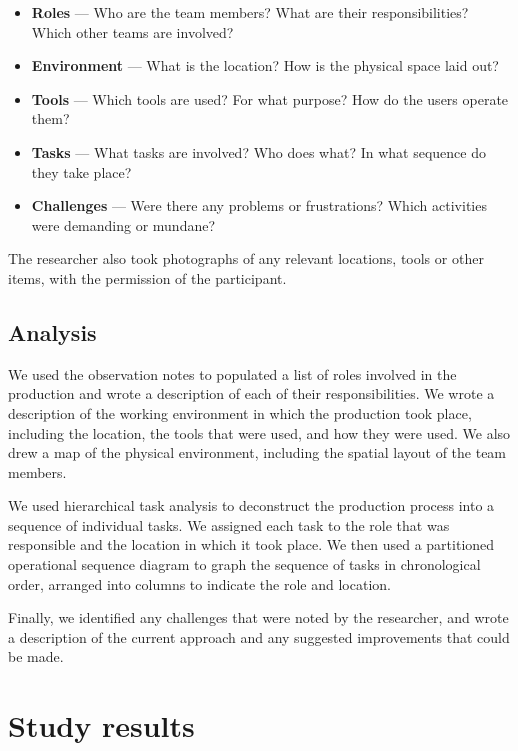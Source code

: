 \begin{itemize}
	\item \textbf{Roles} --- Who are the team members? What are their responsibilities? Which other teams are involved?
	\item \textbf{Environment} --- What is the location? How is the physical space laid out?
	\item \textbf{Tools} --- Which tools are used? For what purpose? How do the users operate them?
	\item \textbf{Tasks} --- What tasks are involved? Who does what? In what sequence do they take place?
	\item \textbf{Challenges} --- Were there any problems or frustrations? Which activities were demanding or mundane?
\end{itemize}

The researcher also took photographs of any relevant locations, tools or other items, with the permission of the
participant.

\subsection{Analysis}

We used the observation notes to populated a list of roles involved in the production and wrote a description of each
of their responsibilities. We wrote a description of the working environment in which the production took place,
including the location, the tools that were used, and how they were used. We also drew a map of the physical
environment, including the spatial layout of the team members.

We used hierarchical task analysis \citep{Kirwan1992,Annett2000} to deconstruct the production process into a sequence
of individual tasks. We assigned each task to the role that was responsible and the location in which it took
place. We then used a partitioned operational sequence diagram \citep{Kirwan1992} to graph the sequence of tasks in
chronological order, arranged into columns to indicate the role and location.

Finally, we identified any challenges that were noted by the researcher, and wrote a description of the current
approach and any suggested improvements that could be made.

\section{Study results}\label{sec:ethno-results}

